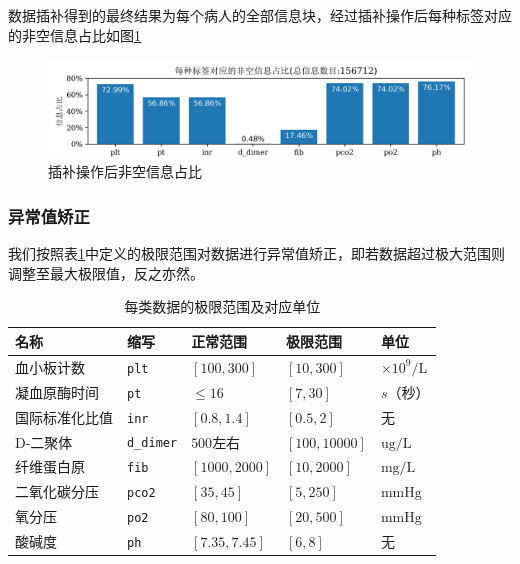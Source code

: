 \documentclass[12pt, a4paper, oneside]{ctexart}
\numberwithin{equation}{section}  %
\let\leq=\leqslant %
\begin{document}
数据插补得到的最终结果为每个病人的全部信息块，经过插补操作后每种标签对应的非空信息占比如图\ref{fig-interpolation}
\vspace{-1em}
\begin{figure}[H]
    \hspace{-1.5cm}
    \includegraphics[scale=0.21]{info_vs_ratio_label_plot}
    \caption{插补操作后非空信息占比}
    \label{fig-interpolation}
\end{figure}
\subsubsection{异常值矫正}
我们按照表\ref{table-limit}中定义的极限范围对数据进行异常值矫正，即若数据超过极大范围则调整至最大极限值，反之亦然。
\renewcommand\arraystretch{1.2} %
\begin{table}[H] %
    \centering %
    \begin{tabular}{p{}p{}p{}<{\centering}
        p{}<{\centering}p{}} %
        \toprule
        \textbf{名称}&\textbf{缩写}&\textbf{正常范围}&\textbf{极限范围}&\textbf{单位}\\
        \midrule
        血小板计数&\texttt{plt}&$[100,300]$&$[10,300]$&$\times 10^9/\text{L}$\\
        凝血原酶时间&\texttt{pt}&$\leq 16$&$[7,30]$&$s$（秒）\\
        国际标准化比值&\texttt{inr}&$[0.8,1.4]$&$[0.5,2]$&无\\
        D-二聚体&\texttt{d\_dimer}&$500$左右&$[100,10000]$&$\text{ug}/\text{L}$\\
        纤维蛋白原&\texttt{fib}&$[1000,2000]$&$[10,2000]$&$\text{mg}/\text{L}$\\
        二氧化碳分压&\texttt{pco2}&$[35,45]$&$[5,250]$&$\text{mmHg}$\\
        氧分压&\texttt{po2}&$[80,100]$&$[20,500]$&$\text{mmHg}$\\
        酸碱度&\texttt{ph}&$[7.35,7.45]$&$[6,8]$&无\\
        \bottomrule
    \end{tabular}
    \caption{每类数据的极限范围及对应单位}
    \label{table-limit}
\end{table}
\end{document}
